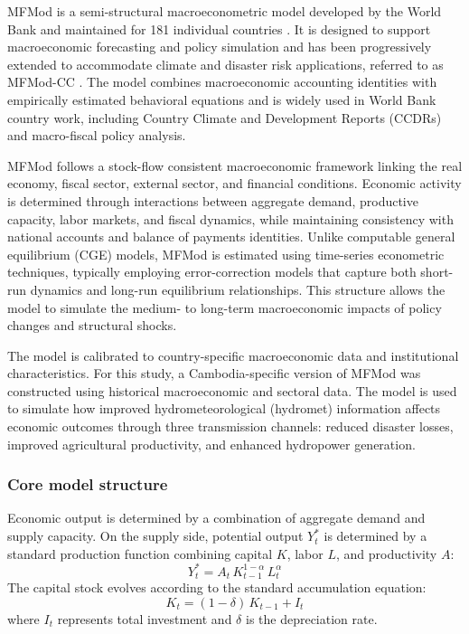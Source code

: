 \documentclass[
  final,
  10pt,
  letterpaper,
  english,
]{article}
\begin{document}
MFMod is a semi-structural macroeconometric model developed by the World Bank
and maintained for 181 individual countries \parencite{burns_world_2019}. It is
designed to support macroeconomic forecasting and policy simulation and has been
progressively extended to accommodate climate and disaster risk applications,
referred to as MFMod-CC \parencite{burns2021climate,burns2021macroeconomic}. The
model combines macroeconomic accounting identities with empirically estimated
behavioral equations and is widely used in World Bank country work, including
Country Climate and Development Reports (CCDRs) and macro-fiscal policy
analysis.

MFMod follows a stock-flow consistent macroeconomic framework linking the real
economy, fiscal sector, external sector, and financial conditions. Economic
activity is determined through interactions between aggregate demand, productive
capacity, labor markets, and fiscal dynamics, while maintaining consistency with
national accounts and balance of payments identities. Unlike computable general
equilibrium (CGE) models, MFMod is estimated using time-series econometric
techniques, typically employing error-correction models that capture both
short-run dynamics and long-run equilibrium relationships. This structure allows
the model to simulate the medium- to long-term macroeconomic impacts of policy
changes and structural shocks.

The model is calibrated to country-specific macroeconomic data and institutional
characteristics. For this study, a Cambodia-specific version of MFMod was
constructed using historical macroeconomic and sectoral data. The model is used
to simulate how improved hydrometeorological (hydromet) information affects
economic outcomes through three transmission channels: reduced disaster losses,
improved agricultural productivity, and enhanced hydropower generation.

\subsubsection{Core model structure}
Economic output is determined by a combination of aggregate demand and supply
capacity. On the supply side, potential output $Y^*_t$ is determined by a
standard production function combining capital $K$, labor $L$, and productivity
$A$:
\begin{equation}
  Y^*_t = A_t\,K_{t-1}^{1-\alpha}\,L_t^{\alpha}
\end{equation}
The capital stock evolves according to the standard accumulation equation:
\begin{equation}
  K_t = (1 - \delta)\,K_{t-1} + I_t
\end{equation}
where $I_t$ represents total investment and $\delta$ is the depreciation rate.
\end{document}
